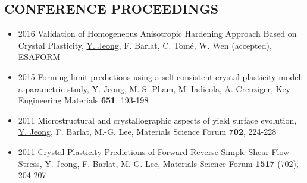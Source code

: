 \documentclass{res}
\begin{document}
\begin{resume}
  \section{CONFERENCE PROCEEDINGS}
  \begin{itemize}
  \item 2016 Validation of Homogeneous Anisotropic Hardening Approach Based on Crystal Plasticity, \underline{Y. Jeong}, F. Barlat, C. Tom\'{e}, W. Wen (accepted), ESAFORM
  \item 2015 Forming limit predictions using a self-consistent crystal plasticity model: a parametric study, \underline{Y. Jeong}, M.-S. Pham, M. Iadicola, A. Creuziger, Key Engineering Materials {\bf 651}, 193-198
  \item 2011 Microstructural and crystallographic aspects of yield surface evolution, \underline{Y. Jeong}, F. Barlat, M.-G. Lee,  Materials Science Forum {\bf 702}, 224-228
  \item 2011 Crystal Plasticity Predictions of Forward-Reverse Simple Shear Flow Stress, \underline{Y. Jeong}, F. Barlat, M.-G. Lee, Materials Science Forum {\bf 1517} (702), 204-207
  \end{itemize}


\end{resume}
\end{document}
